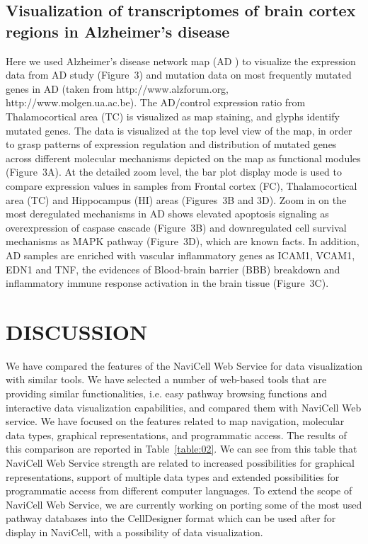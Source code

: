 \documentclass[a4,center,fleqn]{NAR}
\begin{document}
\subsection{Visualization of transcriptomes of brain cortex regions in Alzheimer's disease}

Here we used Alzheimer's disease network map (AD \cite{Mizuno2012}) to visualize
the expression data from AD study \cite{hokama2013altered} (Figure~3) and mutation data on most frequently
mutated genes in AD (taken from http://www.alzforum.org,
http://www.molgen.ua.ac.be). The AD/control expression ratio from
Thalamocortical area (TC) is visualized as map staining, and glyphs identify
mutated genes. The data is visualized at the top level view of the map, in
order to grasp patterns of expression regulation and distribution of mutated
genes across different molecular mechanisms depicted on the map as functional
modules (Figure~3A). At the detailed zoom level, the bar plot display mode is
used to compare expression values in
samples from Frontal cortex (FC), Thalamocortical area (TC) and Hippocampus
(HI) areas (Figures~3B and 3D).  Zoom in on the most deregulated mechanisms in
AD shows elevated apoptosis signaling as overexpression of caspase cascade
(Figure~3B) and downregulated cell survival mechanisms as MAPK pathway (Figure~3D),
which are known facts. In addition, AD
samples are enriched with vascular inflammatory genes as ICAM1, VCAM1, EDN1 and
TNF, the evidences of Blood-brain barrier (BBB) breakdown and inflammatory
immune response activation in the brain tissue (Figure~3C).

\section{DISCUSSION}

We have compared the features of the NaviCell Web Service for data visualization
with similar tools. We have selected a number of web-based tools that are providing
similar functionalities, i.e. easy pathway browsing functions and interactive data
visualization capabilities, and compared them with NaviCell Web service. We have focused on the features
related to map navigation, molecular data types, graphical representations,
and programmatic access. The results of this comparison are reported in Table~\ref{table:02}.
We can see from this table that NaviCell Web Service strength are related to
increased possibilities for graphical representations, support of multiple
data types and extended possibilities for programmatic access from different
computer languages.  To extend the scope of NaviCell Web Service, we are
currently working on porting some of the most used pathway databases into the
CellDesigner format which can be used after for display in NaviCell, with a
possibility of data visualization.
\end{document}
